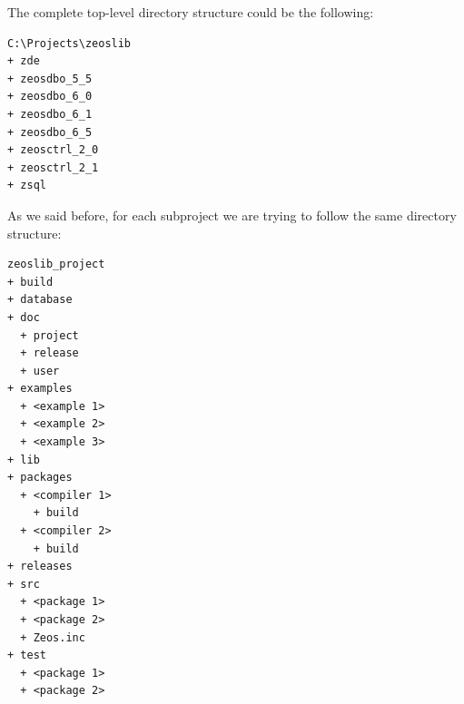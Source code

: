 \documentclass[a4paper,12pt,oneside]{book}
\begin{document}
The complete top-level directory structure could be the following:
\begin{verbatim}
C:\Projects\zeoslib
+ zde
+ zeosdbo_5_5
+ zeosdbo_6_0
+ zeosdbo_6_1
+ zeosdbo_6_5
+ zeosctrl_2_0
+ zeosctrl_2_1
+ zsql
\end{verbatim}

As we said before, for each subproject we are trying to follow the same directory structure:
\begin{verbatim}
zeoslib_project
+ build
+ database
+ doc
  + project
  + release
  + user
+ examples
  + <example 1>
  + <example 2>
  + <example 3>
+ lib
+ packages
  + <compiler 1>
    + build
  + <compiler 2>
    + build
+ releases
+ src
  + <package 1>
  + <package 2>
  + Zeos.inc
+ test
  + <package 1>
  + <package 2>
\end{verbatim}
\end{document}
